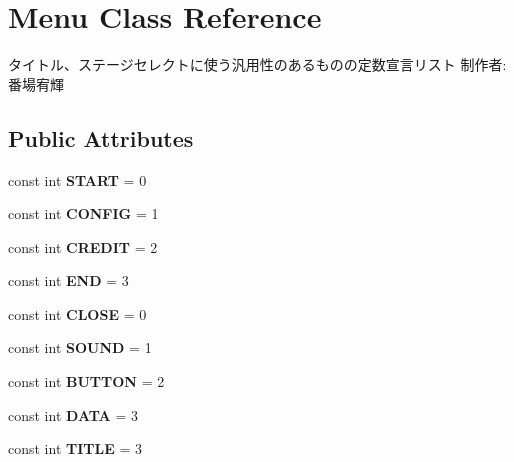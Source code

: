 \hypertarget{class_menu}{}\section{Menu Class Reference}
\label{class_menu}


タイトル、ステージセレクトに使う汎用性のあるものの定数宣言リスト 制作者\+:番場宥輝  


\subsection*{Public Attributes}
\begin{DoxyCompactItemize}
\item 
\mbox{\label{class_menu_a7482b3b24c83ee9bc324cd847c6ae616}} 
const int {\bfseries S\+T\+A\+RT} = 0
\item 
\mbox{\label{class_menu_a6f7339ebb848f3650afefbf84de17e7d}} 
const int {\bfseries C\+O\+N\+F\+IG} = 1
\item 
\mbox{\label{class_menu_a3f8aaa16153c81c07cae42f717731fd5}} 
const int {\bfseries C\+R\+E\+D\+IT} = 2
\item 
\mbox{\label{class_menu_ad4e0d5e422ad011b28fa0d63af18bddf}} 
const int {\bfseries E\+ND} = 3
\item 
\mbox{\label{class_menu_a7bfefe7a50519041406d34c7e3f652f2}} 
const int {\bfseries C\+L\+O\+SE} = 0
\item 
\mbox{\label{class_menu_a8c372576b56a178c9ecf8d98fbf2f0b2}} 
const int {\bfseries S\+O\+U\+ND} = 1
\item 
\mbox{\label{class_menu_a0e6422437772a7778610e97a84391a80}} 
const int {\bfseries B\+U\+T\+T\+ON} = 2
\item 
\mbox{\label{class_menu_a75d630e6e1f58de86dc98d83386ab1ae}} 
const int {\bfseries D\+A\+TA} = 3
\item 
\mbox{\label{class_menu_a6005de695a03a0f09acf70cc3ef98847}} 
const int {\bfseries T\+I\+T\+LE} = 3
\item 
\mbox{\label{class_menu_af9d4bb40f84ead28fe960c431a0ca7b2}} 

\end{DoxyCompactItemize}
